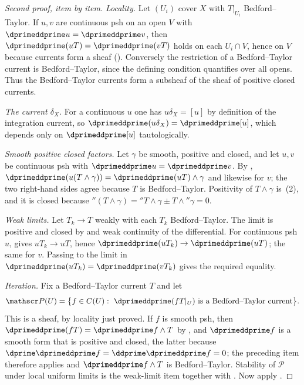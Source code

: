 \begin{proof}[Second proof, item by item]
\emph{Locality.}  Let $(U_i)$ cover $X$ with $T|_{U_i}$ Bedford--Taylor.  If
$u,v$ are continuous psh on an open $V$ with
$\dprimeddprime u=\dprimeddprime v$, then
$\dprimeddprime(uT)=\dprimeddprime(vT)$ holds on each $U_i\cap V$, hence on
$V$ because currents form a sheaf ().  Conversely
the restriction of a Bedford--Taylor current is Bedford--Taylor, since the
defining condition quantifies over all opens.  Thus the Bedford--Taylor
currents form a subsheaf of the sheaf of positive closed currents.

\emph{The current $\delta_X$.}  For a continuous $u$ one has
$u\delta_X=[u]$ by definition of the integration current, so
$\dprimeddprime(u\delta_X)=\dprimeddprime[u]$, which depends only on
$\dprimeddprime[u]$ tautologically.

\emph{Smooth positive closed factors.}  Let $\gamma$ be smooth, positive and
closed, and let $u,v$ be continuous psh with
$\dprimeddprime u=\dprimeddprime v$.  By
,
$\dprimeddprime(u(T\wedge\gamma))=\dprimeddprime(uT)\wedge\gamma$ and
likewise for $v$; the two right-hand sides agree because $T$ is
Bedford--Taylor.  Positivity of $T\wedge\gamma$ is
\,(2), and it is closed because
$\dprime(T\wedge\gamma)=\dprime T\wedge\gamma\pm T\wedge\dprime\gamma=0$.

\emph{Weak limits.}  Let $T_k\to T$ weakly with each $T_k$ Bedford--Taylor.
The limit is positive and closed by
 and weak continuity of the
differential.  For continuous psh $u$,
 gives $uT_k\to uT$, hence
$\dprimeddprime(uT_k)\to\dprimeddprime(uT)$; the same for $v$.  Passing to
the limit in $\dprimeddprime(uT_k)=\dprimeddprime(vT_k)$ gives the required
equality.

\emph{Iteration.}  Fix a Bedford--Taylor current $T$ and let
\[
 \mathscr P(U)=\bigl\{f\in C(U):\ \dprimeddprime(fT|_U)
   \text{ is a Bedford--Taylor current}\bigr\}.
\]
This is a sheaf, by locality just proved.  If $f$ is smooth psh, then
$\dprimeddprime(fT)=\dprimeddprime f\wedge T$ by
, and $\dprimeddprime f$ is a smooth form that is
positive and closed, the latter because
$\dprime\dprimeddprime f=\ddprime\dprimeddprime f=0$; the preceding item
therefore applies and $\dprimeddprime f\wedge T$ is Bedford--Taylor.
Stability of $\mathscr P$ under local uniform limits is
the weak-limit item together with
.  Now apply
.
\end{proof}

